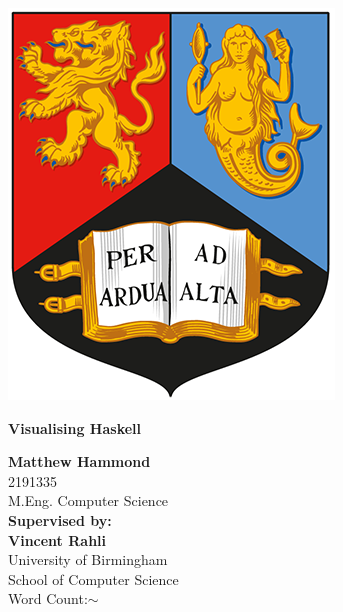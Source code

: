\vspace*{\fill}
\begin{center}
\Large

\includegraphics[scale = 1.5]{preamble/images/UoBCrest}
\vspace{20mm}

\textbf{\Huge Visualising Haskell}\\
\vspace{20mm}

\textbf{Matthew Hammond}\\
2191335\\
M.Eng. Computer Science\\
\vspace{10mm}
\textbf{Supervised by:\\Vincent Rahli}\\
University of Birmingham\\
School of Computer Science\\
\vspace{10mm}
Word Count:$\sim$\wordcount
    
\end{center}
\vspace*{\fill}